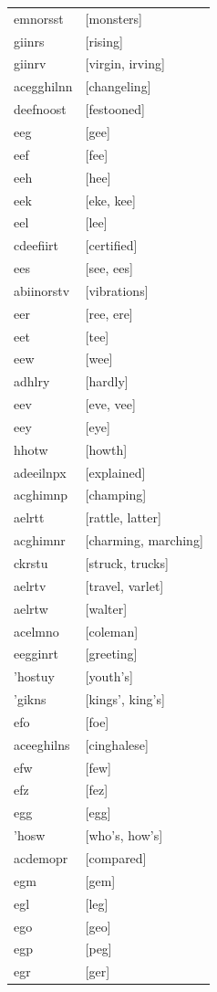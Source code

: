 \documentclass{article}
\begin{document}
\begin{tabular}{ll}
emnorsst & [monsters] \\
giinrs & [rising] \\
giinrv & [virgin, irving] \\
acegghilnn & [changeling] \\
deefnoost & [festooned] \\
eeg & [gee] \\
eef & [fee] \\
eeh & [hee] \\
eek & [eke, kee] \\
eel & [lee] \\
cdeefiirt & [certified] \\
ees & [see, ees] \\
abiinorstv & [vibrations] \\
eer & [ree, ere] \\
eet & [tee] \\
eew & [wee] \\
adhlry & [hardly] \\
eev & [eve, vee] \\
eey & [eye] \\
hhotw & [howth] \\
adeeilnpx & [explained] \\
acghimnp & [champing] \\
aelrtt & [rattle, latter] \\
acghimnr & [charming, marching] \\
ckrstu & [struck, trucks] \\
aelrtv & [travel, varlet] \\
aelrtw & [walter] \\
acelmno & [coleman] \\
eegginrt & [greeting] \\
'hostuy & [youth's] \\
'gikns & [kings', king's] \\
efo & [foe] \\
aceeghilns & [cinghalese] \\
efw & [few] \\
efz & [fez] \\
egg & [egg] \\
'hosw & [who's, how's] \\
acdemopr & [compared] \\
egm & [gem] \\
egl & [leg] \\
ego & [geo] \\
egp & [peg] \\
egr & [ger] \\

\end{tabular}
\end{document}
